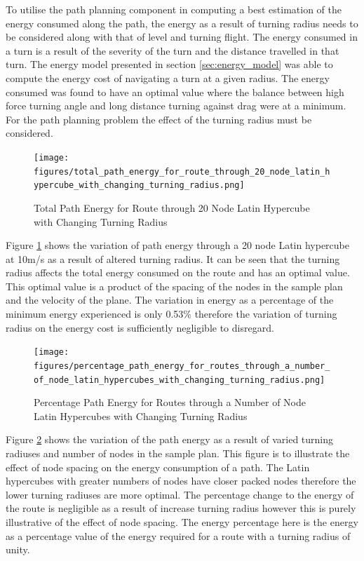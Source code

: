 \documentclass[a4paper,12pt,twoside]{article}
\begin{document}
To utilise the path planning component in computing a best estimation of the energy consumed along the path, the energy as a result of turning radius needs to be considered along with that of level and turning flight. The energy consumed in a turn is a result of the severity of the turn and the distance travelled in that turn. The energy model presented in section \ref{sec:energy_model} was able to compute the energy cost of navigating a turn at a given radius. The energy consumed was found to have an optimal value where the balance between high force turning angle and long distance turning against drag were at a minimum. For the path planning problem the effect of the turning radius must be considered.

\begin{figure}
\centering
\texttt{[image: figures/total\_path\_energy\_for\_route\_through\_20\_node\_latin\_hypercube\_with\_changing\_turning\_radius.png]} 
\caption{Total Path Energy for Route through 20 Node Latin Hypercube with Changing Turning Radius}
\label{fig:total_path_energy_for_route_through_20_node_latin_hypercube_with_changing_turning_radius}
\end{figure}

Figure \ref{fig:total_path_energy_for_route_through_20_node_latin_hypercube_with_changing_turning_radius} shows the variation of path energy through a 20 node Latin hypercube at 10m/s as a result of altered turning radius. It can be seen that the turning radius affects the total energy consumed on the route and has an optimal value. This optimal value is a product of the spacing of the nodes in the sample plan and the velocity of the plane. The variation in energy as a percentage of the minimum energy experienced is only 0.53\% therefore the variation of turning radius on the energy cost is sufficiently negligible to disregard.

\begin{figure}
\centering
\texttt{[image: figures/percentage\_path\_energy\_for\_routes\_through\_a\_number\_of\_node\_latin\_hypercubes\_with\_changing\_turning\_radius.png]} 
\caption{Percentage Path Energy for Routes through a Number of Node Latin Hypercubes with Changing Turning Radius}
\label{fig:percentage_path_energy_for_routes_through_a_number_of_node_latin_hypercubes_with_changing_turning_radius}
\end{figure}

Figure \ref{fig:percentage_path_energy_for_routes_through_a_number_of_node_latin_hypercubes_with_changing_turning_radius} shows the variation of the path energy as a result of varied turning radiuses and number of nodes in the sample plan. This figure is to illustrate the effect of node spacing on the energy consumption of a path. The Latin hypercubes with greater numbers of nodes have closer packed nodes therefore the lower turning radiuses are more optimal. The percentage change to the energy of the route is negligible as a result of increase turning radius however this is purely illustrative of the effect of node spacing. The energy percentage here is the energy as a percentage value of the energy required for a route with a turning radius of unity.
\end{document}
